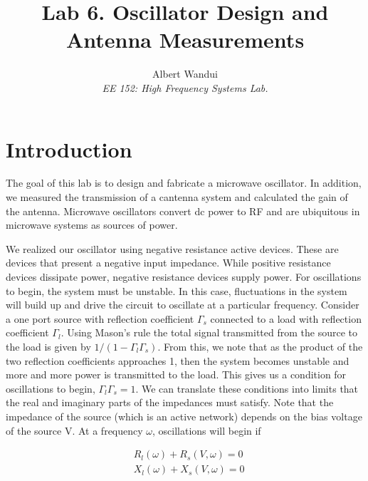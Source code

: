 \documentclass{article}
\begin{document}
\title{Lab 6. Oscillator Design and Antenna Measurements }
\author{Albert Wandui \\
\textit{EE 152: High Frequency Systems Lab.}}
\maketitle


\section*{Introduction}\label{sec:introduction}
The goal of this lab is to design and fabricate a microwave oscillator. In addition, we measured the transmission of a cantenna system and calculated the gain of the antenna. Microwave oscillators convert dc power to RF and are ubiquitous in microwave systems as sources of power. 

We realized our oscillator using negative resistance active devices. These are devices that present a negative input impedance. While positive resistance devices dissipate power, negative resistance devices supply power. For oscillations to begin, the system must be unstable. In this case, fluctuations in the system will build up and drive the circuit to oscillate at a particular frequency. Consider a one port source with reflection coefficient $\Gamma_s$ connected to a load with reflection coefficient $\Gamma_l$. Using Mason's rule the total signal transmitted from the source to the load is given by $1/\left(1 - \Gamma_l \Gamma_s \right)$. From this, we note that as the product of the two reflection coefficients approaches 1, then the system becomes unstable and more and more power is transmitted to the load. This gives us a condition for oscillations to begin, $\Gamma_l \Gamma_s = 1$. We can translate these conditions into limits that the real and imaginary parts of the impedances must satisfy. Note that the impedance of the source (which is an active network) depends on the bias voltage of the source V. At a frequency $\omega$, oscillations will begin if

\begin{align}
    &R_l(\omega) + R_s(V, \omega) = 0 \\
    &X_l (\omega) + X_s(V, \omega) = 0 
\end{align}
\end{document}
